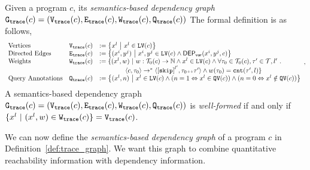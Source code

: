 \begin{defn}
  \label{def:trace_graph}
  Given a program ${c}$,
  its \emph{semantics-based dependency graph} 
  $\mathtt{{G_{trace}}}({c}) = (\mathtt{{V_{trace}}}({c}), \mathtt{{E_{trace}}}({c}), \mathtt{{W_{trace}}}({c}), \mathtt{{Q_{trace}}}({c}))$ 
  The formal definition is as follows,
  {\small
  \[
  \begin{array}{lll}
    \text{Vertices} &
    \traceV({c}) & := \left\{ 
    x^l
    ~ \middle\vert ~ x^l \in \lvar(c)
    \right\}
    \\
    \text{Directed Edges} &
    \traceE({c}) & := 
    \left\{ 
    (x^i, y^j) 
    ~ \middle\vert ~
    x^i, y^j \in \lvar(c) \land \vardep(x^i, y^j, c) 
    \right\}
    \\
    \text{Weights} &
    \traceW({c}) & := 
    \{ 
    (x^l, w) 
    ~ \vert ~ 
    w : \tdom_0(c) \to \mathbb{N}
    \land
    x^l \in \lvar(c) \land
    \forall \trace_0 \in \tdom_0(c), \trace' \in \tdom, l' \st
    \\ & & \qquad \qquad
    \config{{c}, \trace_0} \to^{*} 
    \config{\clabel{\eskip}^{l'}, \trace_0 \tracecat \trace'} 
    \land w(\trace_0) = \vcounter(\trace', l) \} 
     \\
    \text{Query Annotations} &
    \traceF({c}) & := 
  \left\{(x^l, n)  
  ~ \middle\vert ~
   x^l \in \lvar(c) \land
  (n = 1 \Leftrightarrow x^l \in \qvar(c))\land ( n = 0 \Leftrightarrow  x^l \notin \qvar(c))
  \right\}
  \end{array},
  \]
  A semantics-based dependency graph $\mathtt{{G_{trace}}}({c})= (\mathtt{{V_{trace}}}({c}), \mathtt{{E_{trace}}}({c}), \mathtt{{W_{trace}}}({c}), \mathtt{{Q_{trace}}}({c}))$ is \emph{well-formed} if and only if $ \{x^l \ |\ (x^l,w)\in \mathtt{{W_{trace}}}({c})\} = \mathtt{{V_{trace}}}({c}) $.
  }
  \end{defn}
We can now define the \emph{semantics-based dependency graph} of a program $c$ in Definition~\ref{def:trace_graph}. We want this graph to combine quantitative reachability information with dependency information. 

